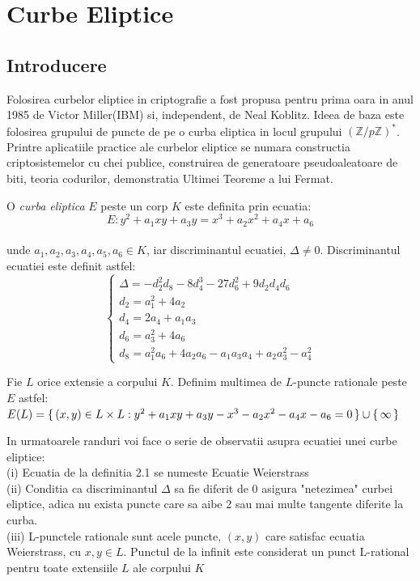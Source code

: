 \chapter{Curbe Eliptice} 
\section{Introducere}
\label{sec:sec01}
Folosirea curbelor eliptice in criptografie a fost propusa pentru prima oara in anul 1985 de Victor Miller(IBM) si, independent, de Neal Koblitz. Ideea de baza este folosirea grupului de puncte de pe o curba eliptica in locul grupului $(\mathbb{Z}/p\mathbb{Z})^{*}$. Printre aplicatiile practice ale curbelor eliptice se numara constructia criptosistemelor cu chei publice, construirea de generatoare pseudoaleatoare de biti, teoria codurilor, demonstratia Ultimei Teoreme a lui Fermat.
\begin{dfn}
O \textit{curba eliptica} $E$ peste un corp $K$ este definita prin ecuatia:
$$E : y^2 + a_1xy + a_3y = x^3 + a_2x^{2} + a_4x + a_6$$ 
\\unde $a_1, a_2, a_3, a_4, a_5, a_6\in K$, iar discriminantul ecuatiei, $\Delta \neq 0$. Discriminantul ecuatiei este definit astfel:
$$ \begin{cases}
\Delta = -d_2^{2}d_8 - 8d_4^{3} - 27d_6^{2} + 9d_2d_4d_6 \\
d_2 = a_1^{2} + 4a_2 \\
d_4 = 2a_4 + a_1a_3 \\
d_6 = a_3^{2} + 4a_6 \\
d_8 = a_1^{2}a_6 + 4a_2a_6 - a_1a_3a_4 + a_2a_3^{2} - a_4^{2}
\end{cases}$$
\end{dfn}
\begin{dfn}
Fie $L$ orice extensie a corpului $K$. Definim multimea de $L$-puncte rationale peste $E$ astfel: $E(L) = \set {(x, y)\in L\times L: y^2 + a_1xy + a_3y - x^3 - a_2x^{2} - a_4x - a_6 = 0} \cup \set {\infty}$
\end{dfn}
\begin{obs}
In urmatoarele randuri voi face o serie de observatii asupra ecuatiei unei curbe eliptice: \\
(i) Ecuatia de la definitia 2.1 se numeste Ecuatie Weierstrass \\
(ii) Conditia ca discriminantul $\Delta$ sa fie diferit de 0 asigura "netezimea" curbei eliptice, adica nu exista puncte care sa aibe 2 sau mai multe tangente diferite la curba. \\
(iii) L-punctele rationale sunt acele puncte, $(x, y)$ care satisfac ecuatia Weierstrass, cu $x, y \in L$. Punctul de la infinit este considerat un punct L-rational pentru toate extensiile $L$ ale corpului $K$
\end{obs}

